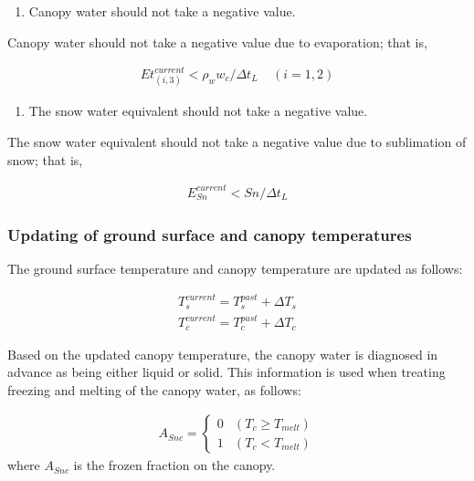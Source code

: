 \begin{enumerate}
\def\labelenumi{\arabic{enumi}.}
\setcounter{enumi}{2}
\tightlist
\item
  Canopy water should not take a negative value.
\end{enumerate}

Canopy water should not take a negative value due to evaporation; that is,

\begin{eqnarray}
   Et_{(i,3)}^{current} < \rho_w w_c /\Delta t_L
   \ \ \ \ \ (i=1,2)
\end{eqnarray}

\begin{enumerate}
\def\labelenumi{\arabic{enumi}.}
\setcounter{enumi}{3}
\tightlist
\item
  The snow water equivalent should not take a negative value.
\end{enumerate}

The snow water equivalent should not take a negative value due to sublimation of snow; that is,

\begin{eqnarray}
   E_{Sn}^{current} < Sn /\Delta t_L
\end{eqnarray}

\hypertarget{updating-of-ground-surface-and-canopy-temperatures}{%
\subsubsection{Updating of ground surface and canopy temperatures}\label{updating-of-ground-surface-and-canopy-temperatures}}

The ground surface temperature and canopy temperature are updated as follows:

\begin{eqnarray}
 T_s^{current} = T_s^{past} + \Delta T_s \\
 T_c^{current} = T_c^{past} + \Delta T_c
\end{eqnarray}

Based on the updated canopy temperature, the canopy water is diagnosed in advance as being either liquid or solid. This information is used when treating freezing and melting of the canopy water, as
follows:

\begin{eqnarray}
 A_{Snc} = \left\{
\begin{array}{ll}
 0 & (T_c \geq T_{melt})\\
 1 & (T_c <    T_{melt})
\end{array}
\right.
\end{eqnarray} where \(A_{Snc}\) is the frozen fraction on the canopy.

